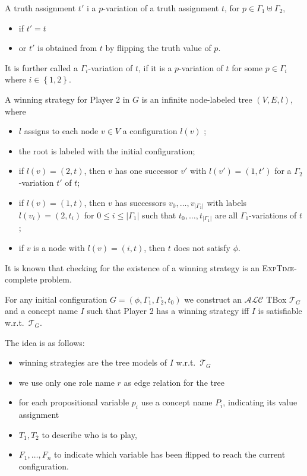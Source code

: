 A truth assignment $t'$ i a $p$-variation of a truth assignment $t$, for $p \in \Gamma_1 \uplus \Gamma_2$,
\begin{itemize}
	\item if $t' = t$
	\item or $t'$ is obtained from $t$ by flipping the truth value of $p$.
\end{itemize}
It is further called a $\Gamma_i$-variation of $t$, if it is a $p$-variation of $t$ for some $p \in \Gamma_i$ where $i \in \left\{ 1,2 \right\}$.

A winning strategy for Player 2 in $G$ is an infinite node-labeled tree $(V,E,l)$, where
\begin{itemize}
	\item $l$ assigns to each node $v \in V$ a configuration $l(v)$ ;
	\item the root is labeled with the initial configuration;
	\item if $l(v) = (2,t)$, then $v$ has one successor $v'$ with $l(v') = (1,t')$ for a  $\Gamma_2$-variation $t'$ of $t$;
	\item if $l(v) = (1,t)$, then $v$ has successors $v_0, \ldots, v_{\lvert \Gamma_1 \rvert}$ with labels
		$l(v_i) = (2,t_i)$ for $0 \leq i \leq \lvert \Gamma_1 \rvert$ such that $t_0, \ldots, t_{\lvert \Gamma_1 \rvert}$
		are all $\Gamma_1$-variations of $t$ ;
	\item if $v$ is a node with $l(v) = (i,t)$, then $t$ does not satisfy $\phi$.
\end{itemize}
It is known that checking for the existence of a winning strategy is an \textsc{ExpTime}-complete problem.

For any initial configuration $G = (\phi, \Gamma_1, \Gamma_2, t_0)$ we construct an $\mathcal{ALC}$ TBox $\mathcal{T}_G$
and a concept name $I$ such that Player 2 has a winning strategy iff $I$ is satisfiable w.r.t.\ $\mathcal{T}_G$.

The idea is as follows:
\begin{itemize}
	\item winning strategies are the tree models of $I$ w.r.t.\ $\mathcal{T}_G$
	\item we use only one role name $r$ as edge relation for the tree
	\item for each propositional variable $p_i$ use a concept name $P_i$, indicating its value assignment
	\item $T_1, T_2$ to describe who is to play,
	\item $F_1, \ldots, F_n$ to indicate which variable has been flipped to reach the current configuration.
\end{itemize}

